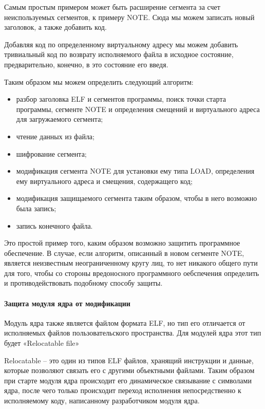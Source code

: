 \documentclass{gost7.32-2001}
\begin{document}
Самым простым примером может быть расширение сегмента за счет
неиспользуемых сегментов, к примеру NOTE. Сюда мы можем записать новый
заголовок, а также добавить код.

Добавляя код по определенному виртуальному адресу мы можем добавить
тривиальный код по возврату исполняемого файла в исходное состояние,
предварительно, конечно, в это состояние его введя.

\newpage
Таким образом мы можем определить следующий алгоритм:
\begin{itemize}
\item
  разбор заголовка ELF и сегментов программы, поиск точки старта
  программы, сегменте NOTE и определения смещений и виртуального
  адреса для загружаемого сегмента;
\item
  чтение данных из файла;
\item
  шифрование сегмента;
\item
  модификация сегмента NOTE для установки ему типа LOAD, определения
  ему виртуального адреса и смещения, содержащего код;
\item
  модификация защищаемого сегмента таким образом, чтобы в него
  возможно была запись;
\item
  запись конечного файла.
\end{itemize}

Это простой пример того, каким образом возможно защитить программное
обеспечение. В случае, если алгоритм, описанный в новом сегменте NOTE,
является неизвестным неограниченному кругу лиц, то нет никакого общего
пути для того, чтобы со стороны вредоносного программного оебспечения
определить и противодействовать подобному способу защиты.

\paragraph{Защита модуля ядра от модификации}

Модуль ядра также является файлом формата ELF, но тип его отличается
от исполняемых файлов пользовательского пространства. Для модулей ядра
этот тип будет «Relocatable file»

Relocatable – это один из типов ELF файлов, хранящий инструкции и
данные, которые позволяют связать его с другими объектными
файлами. Таким образом при старте модуля ядра происходит его
динамическое связывание с символами ядра, после чего только происходит
переход исполнения непосредственно к исполняемому коду, написанному
разработчиком модуля ядра.
\end{document}
